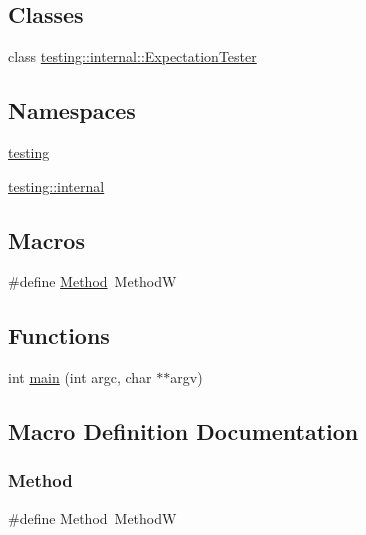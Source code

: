 \subsection*{Classes}
\begin{DoxyCompactItemize}
\item 
class \hyperlink{classtesting_1_1internal_1_1_expectation_tester}{testing\+::internal\+::\+Expectation\+Tester}
\end{DoxyCompactItemize}
\subsection*{Namespaces}
\begin{DoxyCompactItemize}
\item 
 \hyperlink{namespacetesting}{testing}
\item 
 \hyperlink{namespacetesting_1_1internal}{testing\+::internal}
\end{DoxyCompactItemize}
\subsection*{Macros}
\begin{DoxyCompactItemize}
\item 
\#define \hyperlink{gmock-spec-builders__test_8cc_a95606368148f3e5aab5db46c32466afd}{Method}~MethodW
\end{DoxyCompactItemize}
\subsection*{Functions}
\begin{DoxyCompactItemize}
\item 
int \hyperlink{gmock-spec-builders__test_8cc_a3c04138a5bfe5d72780bb7e82a18e627}{main} (int argc, char $\ast$$\ast$argv)
\end{DoxyCompactItemize}


\subsection{Macro Definition Documentation}
\mbox{\label{gmock-spec-builders__test_8cc_a95606368148f3e5aab5db46c32466afd}} 
\subsubsection{\texorpdfstring{Method}{Method}}
{\footnotesize\ttfamily \#define Method~MethodW}



